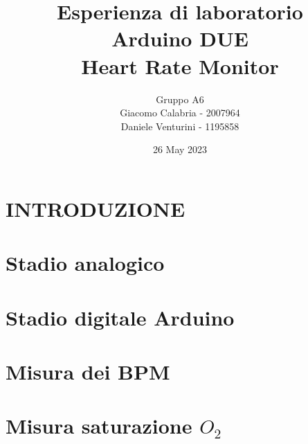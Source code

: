 \documentclass{article}
\title{Esperienza di laboratorio\\\textbf{Arduino DUE\\Heart Rate Monitor}}
\author{Gruppo A6\\Giacomo Calabria - 2007964\\Daniele Venturini - 1195858}
\date{26 May 2023}
\begin{document}
    \maketitle
    \tableofcontents
    \clearpage
    \section{INTRODUZIONE}
    
    
    \section{Stadio analogico}
    
    \clearpage
    
    \section{Stadio digitale Arduino}
    
    \clearpage
    
    \section{Misura dei BPM}
    
    \clearpage
    
    \section{Misura saturazione $O_2$}
    
\end{document}
